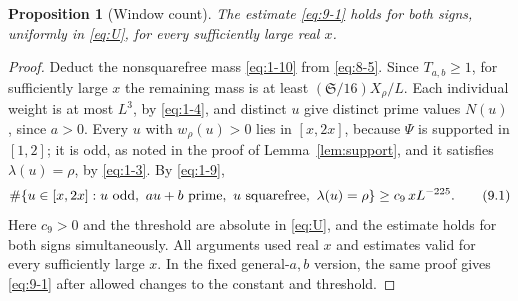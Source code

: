 \documentclass[11pt]{article}
\newtheorem{proposition}[theorem]{Proposition}
\theoremstyle{definition}
\theoremstyle{definition}
\begin{document}
\begin{proposition}[Window count]\label{prop:window}
The estimate \eqref{eq:9-1} holds for both signs, uniformly in \eqref{eq:U}, for every sufficiently large real \(x\).
\end{proposition}
\begin{proof}
Deduct the nonsquarefree mass \eqref{eq:1-10} from \eqref{eq:8-5}. Since \(T_{a,b}\ge1\), for sufficiently large \(x\) the remaining mass is at least \((\mathfrak S/16)X_\rho/L\). Each individual weight is at most \(L^3\), by \eqref{eq:1-4}, and distinct \(u\) give distinct prime values \(N(u)\), since \(a>0\). Every \(u\) with \(w_\rho(u)>0\) lies in \([x,2x]\), because \(\Psi\) is supported in \([1,2]\); it is odd, as noted in the proof of Lemma~\ref{lem:support}, and it satisfies \(\lambda(u)=\rho\), by \eqref{eq:1-3}. By \eqref{eq:1-9},
\begin{equation}
\#\{u\in[x,2x]: u\ {\rm odd},\ au+b\ {\rm prime},\
                 u\ {\rm squarefree},\ \lambda(u)=\rho\}
 \ge c_9\,xL^{-225}.                                   \tag{9.1}\label{eq:9-1}
\end{equation}
Here \(c_9>0\) and the threshold are absolute in \eqref{eq:U}, and the estimate holds for both signs simultaneously. All arguments used real \(x\) and estimates valid for every sufficiently large \(x\). In the fixed general-\(a,b\) version, the same proof gives \eqref{eq:9-1} after allowed changes to the constant and threshold.

\end{proof}
\end{document}
